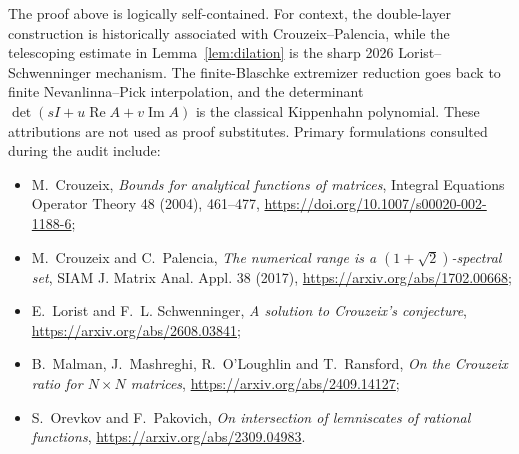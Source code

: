 \documentclass[11pt]{article}
\theoremstyle{definition}
\theoremstyle{remark}
\newcommand{\Rea}{\operatorname{Re}}
\newcommand{\Ima}{\operatorname{Im}}
\begin{document}
The proof above is logically self-contained.  For context, the double-layer
construction is historically associated with Crouzeix--Palencia, while the
telescoping estimate in Lemma~\ref{lem:dilation} is the sharp 2026
Lorist--Schwenninger mechanism.  The finite-Blaschke extremizer reduction goes
back to finite Nevanlinna--Pick interpolation, and the determinant
\(\det(sI+u\Rea A+v\Ima A)\) is the classical Kippenhahn polynomial.  These
attributions are not used as proof substitutes.  Primary formulations
consulted during the audit include:
\begin{itemize}
\item M.~Crouzeix, \emph{Bounds for analytical functions of matrices},
      Integral Equations Operator Theory 48 (2004), 461--477,
      \url{https://doi.org/10.1007/s00020-002-1188-6};
\item M.~Crouzeix and C.~Palencia, \emph{The numerical range is a
      \((1+\sqrt2)\)-spectral set}, SIAM J. Matrix Anal. Appl. 38 (2017),
      \url{https://arxiv.org/abs/1702.00668};
\item E.~Lorist and F.~L. Schwenninger, \emph{A solution to Crouzeix's
      conjecture}, \url{https://arxiv.org/abs/2608.03841};
\item B.~Malman, J.~Mashreghi, R.~O'Loughlin and T.~Ransford,
      \emph{On the Crouzeix ratio for \(N\times N\) matrices},
      \url{https://arxiv.org/abs/2409.14127};
\item S.~Orevkov and F.~Pakovich, \emph{On intersection of lemniscates of
      rational functions}, \url{https://arxiv.org/abs/2309.04983}.
\end{itemize}
\end{document}

